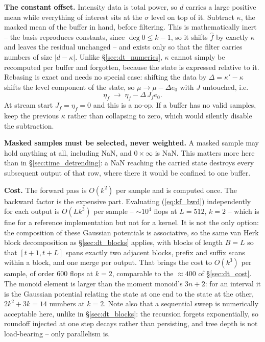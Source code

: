 \documentclass{article}
\numberwithin{equation}{section}   %
\begin{document}
{\bf The constant offset.}  Intensity data is total power, so $d$ carries a large positive mean while
everything of interest sits at the $\sigma$ level on top of it.  Subtract $\kappa$, the masked mean of the
buffer in hand, before filtering.  This is mathematically inert -- the basis reproduces constants, since
$\deg 0 \le k-1$, so it shifts $\hat f$ by exactly $\kappa$ and leaves the residual unchanged -- and exists
only so that the filter carries numbers of size $|d-\kappa|$.  Unlike \S\ref{sec:dt_numerics}, $\kappa$ cannot
simply be recomputed per buffer and forgotten, because the state is expressed relative to it.  Rebasing is
exact and needs no special case: shifting the data by $\Delta = \kappa'-\kappa$ shifts the level component of
the state, so $\mu \rightarrow \mu - \Delta e_0$ with $J$ untouched, i.e.
\begin{equation}
\eta_f \;\longrightarrow\; \eta_f - \Delta\,J_f e_0 .
\label{eq:kf_rebase}
\end{equation}
At stream start $J_f = \eta_f = 0$ and this is a no-op.  If a buffer has no valid samples, keep the previous
$\kappa$ rather than collapsing to zero, which would silently disable the subtraction.

{\bf Masked samples must be selected, never weighted.}  A masked sample may hold anything at all, including
NaN, and $0 \times \infty$ is NaN.  This matters more here than in \S\ref{sec:time_detrending}: a NaN reaching
the carried state destroys every subsequent output of that row, where there it would be confined to one
buffer.

{\bf Cost.}  The forward pass is $O(k^2)$ per sample and is computed once.  The backward factor is the
expensive part.  Evaluating (\ref{eq:kf_bwd}) independently for each output is $O(Lk^3)$ per sample --
$\sim\!10^4$ flops at $L = 512$, $k=2$ -- which is fine for a reference implementation but not for a kernel.
It is not the only option: the composition of these Gaussian potentials is associative, so the same van Herk
block decomposition as \S\ref{sec:dt_blocks} applies, with blocks of length $B = L$ so that
$[t{+}1,t{+}L]$ spans exactly two adjacent blocks, prefix and suffix scans within a block, and one merge per
output.  That brings the cost to $O(k^3)$ per sample, of order $600$ flops at $k=2$, comparable to the
$\approx 400$ of \S\ref{sec:dt_cost}.  The monoid element is larger than the moment monoid's $3n{+}2$: for an
interval it is the Gaussian potential relating the state at one end to the state at the other, $2k^2+3k = 14$
numbers at $k=2$.  Note also that a sequential sweep is numerically acceptable here, unlike in
\S\ref{sec:dt_blocks}: the recursion forgets exponentially, so roundoff injected at one step decays rather
than persisting, and tree depth is not load-bearing -- only parallelism is.
\end{document}
